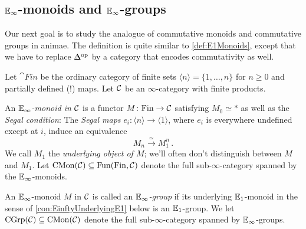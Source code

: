 \subsection{\texorpdfstring{$\mathbb{E}_\infty$}{E-inftinity}-monoids and \texorpdfstring{$\mathbb{E}_\infty$}{E-infinity}-groups}\label{subsec:Einfty}
Our next goal is to study the analogue of commutative monoids and commutative groups in animae. The definition is quite similar to \cref{def:E1Monoids}, except that we have to replace $\IDelta^\op$ by a category that encodes commutativity as well.
\begin{defi}\label{def:EinftyMonoid}
	Let $\cat{Fin}$ be the ordinary category of finite sets $\langle n\rangle =\{1,\dotsc,n\}$ for $n\geqslant 0$ and partially defined (!) maps. Let $\mathcal{C}$ be an $\infty$-category with finite products.
	\begin{alphanumerate}
		\item An \emph{$\mathbb{E}_\infty$-monoid in $\mathcal{C}$} is a functor $M\colon \mathrm{Fin}\rightarrow \mathcal{C}$ satisfying $M_0\simeq *$ as well as the \emph{Segal condition}: The \emph{Segal maps} $e_i\colon \langle n\rangle\rightarrow \langle 1\rangle$, where $e_i$ is everywhere undefined except at $i$, induce an equivalence\label{enum:EinftyMonoid}
		\begin{equation*}
			M_n\overset{\simeq}{\longrightarrow}M_1^n\,.
		\end{equation*}
		We call $M_1$ the \emph{underlying object of $M$}; we'll often don't distinguish between $M$ and $M_1$. Let $\mathrm{CMon}(\mathcal{C})\subseteq\operatorname{Fun}(\mathrm{Fin},\mathcal{C})$ denote the full sub-$\infty$-category spanned by the $\mathbb{E}_\infty$-monoids.
		\item An $\mathbb{E}_\infty$-monoid $M$ in $\mathcal{C}$ is called an \emph{$\mathbb{E}_\infty$-group} if its underlying $\mathbb{E}_1$-monoid in the sense of \cref{con:EinftyUnderlyingE1} below is an $\mathbb{E}_1$-group. We let $\mathrm{CGrp}(\mathcal{C})\subseteq \mathrm{CMon}(\mathcal{C})$ denote the full sub-$\infty$-category spanned by $\mathbb{E}_\infty$-groups. \label{enum:EinftyGroup}
	\end{alphanumerate}
\end{defi}
